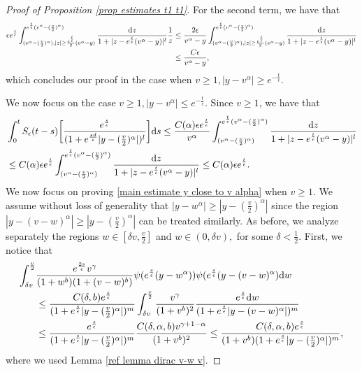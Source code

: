 \documentclass[11pt]{article}
\numberwithin{equation}{section}
\newcommand{\der}{\textup{d}}
\begin{document}
\begin{proof}[Proof of Proposition 
\ref{prop estimates t1 t1}]
For the second term, we have that
\begin{align*}
 \epsilon e^{\frac{t}{\epsilon}} \int_{(v^{\alpha}-(\frac{v}{2})^{\alpha}), |z|\geq \frac{e^{\frac{t}{\epsilon}}}{2}(v^{\alpha}-y)}^{e^{\frac{t}{\epsilon}}(v^{\alpha}-(\frac{v}{2})^{\alpha})}\frac{\der z}{1+|z-e^{\frac{t}{\epsilon}}(v^{\alpha}-y)|^{l}}\frac{1}{z} &\leq \frac{2\epsilon  }{v^{\alpha}-y}\int_{(v^{\alpha}-(\frac{v}{2})^{\alpha}), |z|\geq  \frac{e^{\frac{t}{\epsilon}}}{2}(v^{\alpha}-y)}^{e^{\frac{t}{\epsilon}}(v^{\alpha}-(\frac{v}{2})^{\alpha})}\frac{\der z}{1+|z-e^{\frac{t}{\epsilon}}(v^{\alpha}-y)|^{l}}\\
  &\leq \frac{C\epsilon  }{v^{\alpha}-y},
 \end{align*}
 which concludes our proof in the case when $v\geq 1, |y-v^{\alpha}|\geq e^{-\frac{t}{\epsilon}}$. 
 
We now focus on the case $v\geq 1, |y-v^{\alpha}|\leq  e^{-\frac{t}{\epsilon}}$. Since $v\geq 1$, we have that
\begin{align*}
 &    \int_{0}^{t}S_{\epsilon}(t-s)\bigg[\frac{ e^{\frac{s}{\epsilon}}}{(1+e^{\frac{sd}{\epsilon}}|y-(\frac{v}{2})^{\alpha}|)^{l}}\bigg]\der s\leq \frac{C(\alpha)\epsilon e^{\frac{t}{\epsilon}} }{v^{\alpha}}\int_{(v^{\alpha}-(\frac{v}{2})^{\alpha})}^{e^{\frac{t}{\epsilon}}(v^{\alpha}-(\frac{v}{2})^{\alpha})}\frac{\der z}{1+|z-e^{\frac{t}{\epsilon}}(v^{\alpha}-y)|^{l}}\\
    &\leq C(\alpha)\epsilon e^{\frac{t}{\epsilon}}\int_{(v^{\alpha}-(\frac{v}{2})^{\alpha})}^{e^{\frac{t}{\epsilon}}(v^{\alpha}-(\frac{v}{2})^{\alpha})}\frac{\der z}{1+|z-e^{\frac{t}{\epsilon}}(v^{\alpha}-y)|^{l}}\leq  C(\alpha)\epsilon e^{\frac{t}{\epsilon}}.
\end{align*}
We now focus on proving \eqref{main estimate y close to v alpha} when $v\geq 1$. We assume without loss of generality that $|y-w^{\alpha}|\geq |y-(\frac{v}{2})^{\alpha}|$ since the region $|y-(v-w)^{\alpha}|\geq |y-(\frac{v}{2})^{\alpha}|$ can be treated similarly. As before, we analyze separately the regions $w\in[\delta v, \frac{v}{2}]$ and $w\in(0,\delta v),$ for some $\delta<\frac{1}{2}$. First, we notice that
\begin{align*}
\int_{\delta v}^{\frac{v}{2}}&\frac{e^{\frac{2s}{\epsilon}}v^{\gamma}}{(1+w^{b})(1+(v-w)^{b})}\psi(e^{\frac{s}{\epsilon}}(y-w^{\alpha}))\psi(e^{\frac{s}{\epsilon}}(y-(v-w)^{\alpha})\der w\\
&\leq  \frac{C(\delta,b)e^{\frac{s}{\epsilon}}}{(1+e^{\frac{s}{\epsilon}}|y-(\frac{v}{2})^{\alpha}|)^{m}}\int_{\delta v}^{\frac{v}{2}}\frac{v^{\gamma}}{(1+v^{b})^{2}}\frac{e^{\frac{s}{\epsilon}}\der w}{(1+e^{\frac{s}{\epsilon}}|y-(v-w)^{\alpha}|)^{m}}\\
&\leq \frac{e^{\frac{s}{\epsilon}}}{(1+e^{\frac{s}{\epsilon}}|y-(\frac{v}{2})^{\alpha}|)^{m}}\frac{C(\delta,\alpha,b) v^{\gamma+1-\alpha}}{(1+v^{b})^{2}}\leq  \frac{C(\delta,\alpha,b) e^{\frac{s}{\epsilon}}}{(1+v^{b})(1+e^{\frac{s}{\epsilon}}|y-(\frac{v}{2})^{\alpha}|)^{m}},
\end{align*}
where we used Lemma \ref{ref lemma dirac v-w v}.



\end{proof}
\end{document}
